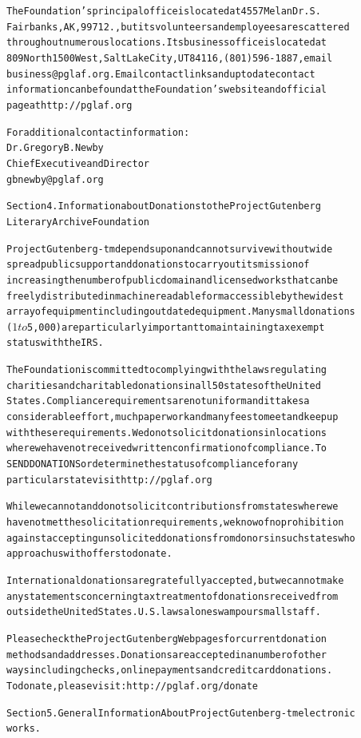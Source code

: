 \documentclass[12pt]{book}[2005/09/16]
\newenvironment{PGtext}{%
\begin{alltt}
\fontsize{8.1}{9}\ttfamily\selectfont}%
{\end{alltt}}
\begin{document}
\begin{PGtext}
The Foundation's principal office is located at 4557 Melan Dr. S.
Fairbanks, AK, 99712., but its volunteers and employees are scattered
throughout numerous locations.  Its business office is located at
809 North 1500 West, Salt Lake City, UT 84116, (801) 596-1887, email
business@pglaf.org.  Email contact links and up to date contact
information can be found at the Foundation's web site and official
page at http://pglaf.org

For additional contact information:
     Dr. Gregory B. Newby
     Chief Executive and Director
     gbnewby@pglaf.org


Section 4.  Information about Donations to the Project Gutenberg
Literary Archive Foundation

Project Gutenberg-tm depends upon and cannot survive without wide
spread public support and donations to carry out its mission of
increasing the number of public domain and licensed works that can be
freely distributed in machine readable form accessible by the widest
array of equipment including outdated equipment.  Many small donations
($1 to $5,000) are particularly important to maintaining tax exempt
status with the IRS.

The Foundation is committed to complying with the laws regulating
charities and charitable donations in all 50 states of the United
States.  Compliance requirements are not uniform and it takes a
considerable effort, much paperwork and many fees to meet and keep up
with these requirements.  We do not solicit donations in locations
where we have not received written confirmation of compliance.  To
SEND DONATIONS or determine the status of compliance for any
particular state visit http://pglaf.org

While we cannot and do not solicit contributions from states where we
have not met the solicitation requirements, we know of no prohibition
against accepting unsolicited donations from donors in such states who
approach us with offers to donate.

International donations are gratefully accepted, but we cannot make
any statements concerning tax treatment of donations received from
outside the United States.  U.S. laws alone swamp our small staff.

Please check the Project Gutenberg Web pages for current donation
methods and addresses.  Donations are accepted in a number of other
ways including checks, online payments and credit card donations.
To donate, please visit: http://pglaf.org/donate


Section 5.  General Information About Project Gutenberg-tm electronic
works.


\end{PGtext}
\end{document}
